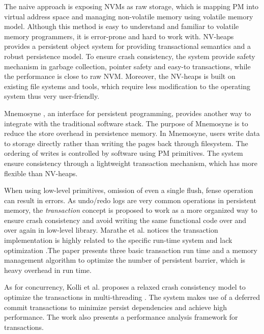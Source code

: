 \documentclass{sig-alternate}
\begin{document}
The naive approach is exposing NVMs as raw storage, which is mapping PM into virtual address space and managing non-volatile memory using volatile memory model. Although this method is easy to understand and familiar to volatile memory programmers, it is error-prone and hard to work with. NV-heaps \cite{Coburn:2011:NMP:1961296.1950380} provides a persistent object system for providing transactional semantics and a robust persistence model. To ensure crash consistency, the system provide safety mechanism in garbage collection, pointer safety and easy-to transactions, while the performance is close to raw NVM. Moreover, the NV-heaps is built on existing file systems and tools, which require less modification to the operating system thus very user-friendly.

	Mnemosyne \cite {Volos:2011:MLP:2248487.1950379}, an interface for persistent programming, provides another way to integrate with the traditional software stack. The purpose of Mnemosyne is to reduce the store overhead in persistence memory. In Mnemosyne, users write data to storage directly rather than writing the pages back through filesystem. The ordering of writes is controlled by software using PM primitives. The system ensure consistency through a lightweight transaction mechanism, which has more flexible than NV-heaps.

	When using low-level primitives, omission of even a single flush, fense operation can result in errors. As undo/redo logs are very common operations in persistent memory, the \textit{transaction} concept is proposed to work as a more organized way to ensure crash consistency and avoid writing the same functional code over and over again in low-level library. Marathe et al. notices the transaction implementation is highly related to the specific run-time system and lack optimization \cite{DBLP:journals/corr/abs-1804-00701}.The paper presents three basic transaction run time and a memory management algorithm to optimize the number of persistent barrier, which is heavy overhead in run time.

	As for concurrency, Kolli et al. proposes a relaxed crash consistency model to optimize the transactions in multi-threading \cite{Kolli:2016:HTP:2954679.2872381}. The system makes use of a deferred commit transactions to minimize persist dependencies and achieve high performance. The work also presents a performance analysis framework for transactions.
\end{document}
